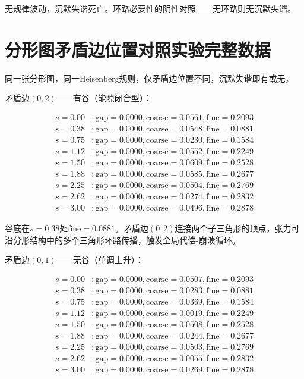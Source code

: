 \documentclass[11pt,a4paper]{book}
\theoremstyle{definition}
\begin{document}
无规律波动，沉默失谐死亡。环路必要性的阴性对照——无环路则无沉默失谐。

\chapter{分形图矛盾边位置对照实验完整数据}

同一张分形图，同一Heisenberg规则，仅矛盾边位置不同，沉默失谐即有或无。

矛盾边$(0,2)$——有谷（能隙闭合型）：

\begin{align*}
s=0.00 &: \text{gap}=0.0000, \text{coarse}=0.0561, \text{fine}=0.2093 \\
s=0.38 &: \text{gap}=0.0000, \text{coarse}=0.0548, \text{fine}=0.0881 \\
s=0.75 &: \text{gap}=0.0000, \text{coarse}=0.0230, \text{fine}=0.1584 \\
s=1.12 &: \text{gap}=0.0000, \text{coarse}=0.0552, \text{fine}=0.2249 \\
s=1.50 &: \text{gap}=0.0000, \text{coarse}=0.0609, \text{fine}=0.2528 \\
s=1.88 &: \text{gap}=0.0000, \text{coarse}=0.0585, \text{fine}=0.2677 \\
s=2.25 &: \text{gap}=0.0000, \text{coarse}=0.0504, \text{fine}=0.2769 \\
s=2.62 &: \text{gap}=0.0000, \text{coarse}=0.0274, \text{fine}=0.2832 \\
s=3.00 &: \text{gap}=0.0000, \text{coarse}=0.0496, \text{fine}=0.2878
\end{align*}

谷底在$s=0.38$处$\text{fine}=0.0881$。矛盾边$(0,2)$连接两个子三角形的顶点，张力可沿分形结构中的多个三角形环路传播，触发全局代偿-崩溃循环。

矛盾边$(0,1)$——无谷（单调上升）：

\begin{align*}
s=0.00 &: \text{gap}=0.0000, \text{coarse}=0.0507, \text{fine}=0.2093 \\
s=0.38 &: \text{gap}=0.0000, \text{coarse}=0.0283, \text{fine}=0.0881 \\
s=0.75 &: \text{gap}=0.0000, \text{coarse}=0.0369, \text{fine}=0.1584 \\
s=1.12 &: \text{gap}=0.0000, \text{coarse}=0.0019, \text{fine}=0.2249 \\
s=1.50 &: \text{gap}=0.0000, \text{coarse}=0.0508, \text{fine}=0.2528 \\
s=1.88 &: \text{gap}=0.0000, \text{coarse}=0.0244, \text{fine}=0.2677 \\
s=2.25 &: \text{gap}=0.0000, \text{coarse}=0.0503, \text{fine}=0.2769 \\
s=2.62 &: \text{gap}=0.0000, \text{coarse}=0.0055, \text{fine}=0.2832 \\
s=3.00 &: \text{gap}=0.0000, \text{coarse}=0.0269, \text{fine}=0.2878
\end{align*}
\end{document}
